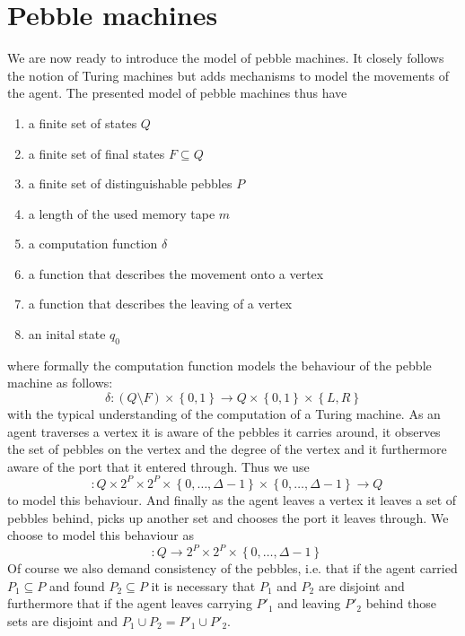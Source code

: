 \documentclass[draft,oneside]{scrartcl}
\DeclareMathOperator{\din}{\delta_{\mathit{in}}}
\DeclareMathOperator{\dout}{\delta_{\mathit{out}}}
\begin{document}
\section{Pebble machines}
We are now ready to introduce the model of pebble machines. It closely
follows the notion of Turing machines but adds mechanisms to model the
movements of the agent. The presented model of pebble machines thus have
\begin{enumerate}
  \item a finite set of states $Q$
  \item a finite set of final states $F\subseteq Q$
  \item a finite set of distinguishable pebbles $P$
  \item a length of the used memory tape $m$
  \item a computation function $\delta$
  \item a function that describes the movement onto a vertex
    $\din$
  \item a function that describes the leaving of a vertex $\dout$
  \item an inital state $q_{0}$
\end{enumerate}
where formally the computation function models the behaviour of the pebble
machine as follows:
\begin{equation*}
  \delta\colon (Q\setminus F)\times\left\{0,1\right\}\rightarrow
  Q\times\left\{0,1\right\}\times\left\{L,R\right\}
\end{equation*}
with the typical understanding of the computation of a Turing machine.
As an agent traverses a vertex it is aware of the pebbles it carries
around, it observes the set of pebbles on the vertex and the degree of the
vertex and it furthermore aware of the port that it entered through.
Thus we use
\begin{equation*}
  \din\colon Q\times 2^{P}\times 2^{P}\times
  \left\{0,\dots,\Delta - 1\right\}\times\left\{0,\dots,\Delta - 1\right\}
  \rightarrow Q
\end{equation*}
to model this behaviour. And finally as the agent leaves a vertex it leaves
a set of pebbles behind, picks up another set and chooses the port it leaves
through. We choose to model this behaviour as
\begin{equation*}
  \dout\colon Q
  \rightarrow 2^{P}\times 2^{P}\times \left\{0,\dots,\Delta - 1\right\}
\end{equation*}
Of course we also demand consistency of the pebbles, i.e. that if the agent
carried $P_{1}\subseteq P$ and found $P_{2}\subseteq P$ it is necessary that
$P_{1}$ and $P_{2}$ are disjoint and furthermore that if the agent leaves
carrying $P'_{1}$ and leaving $P'_{2}$ behind those sets are disjoint and
$P_{1}\cup P_{2} = P'_{1}\cup P'_{2}$.
\end{document}
